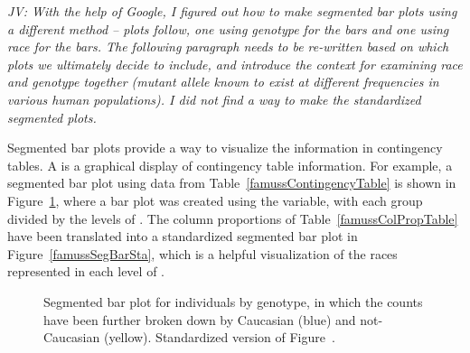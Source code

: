 \begin{doublespace}
\textit{JV: With the help of Google, I figured out how to make segmented bar plots using a different method -- plots follow, one using genotype for the bars and one using race for the bars. The following paragraph needs to be re-written based on which plots we ultimately decide to include, and introduce the context for examining race and genotype together (mutant allele known to exist at different frequencies in various human populations). I did not find a way to make the standardized segmented plots.}

Segmented bar plots provide a way to visualize the information in contingency tables. A  is a graphical display of contingency table information. For example, a segmented bar plot using data from Table~\ref{famussContingencyTable} is shown in Figure~\ref{famussSegBarPlot}, where a bar plot was created using the  variable, with each group divided by the levels of . The column proportions of Table~\ref{famussColPropTable} have been translated into a standardized segmented bar plot in Figure~\ref{famussSegBarSta}, which is a helpful visualization of the races represented in each level of .

\begin{figure}[h]
\centering
{}
\caption{ Segmented bar plot for individuals by genotype, in which the counts have been further broken down by Caucasian (blue) and not-Caucasian (yellow).  Standardized version of Figure~.}
\label{famussSegBarPlot}
\end{figure}


\end{doublespace}
